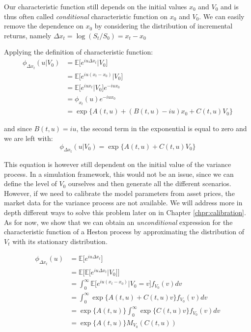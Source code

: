 \bigskip


Our characteristic function still depends on the initial values $x_0$ and  $V_0$ and is thus often called \textit{conditional} characteristic function on $x_0$ and $V_0$.
We can easily remove the dependence on $x_0$ by considering the distribution of incremental returns, namely $\Delta x_t = \log (S_t / S_0) = x_t - x_0$

Applying the definition of characteristic function:
\begin{equation*}
	\begin{split}
	\phi_{\Delta x_t}(u|V_0) &= \mathbb{E}\big[e^{i u \Delta x_t} |V_0\big] \\
	&=  \mathbb{E}\big[e^{i u ( x_t - x_0)}|V_0\big]\\
	&= \mathbb{E}\big[e^{i u x_t}|V_0\big] e^{-i u x_0}\\
	&= \phi_{x_t}(u) e^{-i u x_0}\\
	&= \exp\{A(t,u) + (B(t,u) - iu) x_0 + C(t,u) V_0\}
	\end{split}
\end{equation*}

and since $B(t,u)  = i u$, the second term in the exponential is equal to zero and we are left with:
\begin{equation}
\label{eq:chf_V0}
\phi_{\Delta x_t}(u|V_0) =  \exp\{A(t,u) + C(t,u) V_0\}
\end{equation}




This equation is however still dependent on the initial value of the variance process. In a simulation framework, this would not be an issue, since we can define the level of $V_0$ ourselves and then generate all the different scenarios. However, if we need to calibrate the model parameters from asset prices, the market data for the variance process are not available. We will address more in depth different ways to solve this problem later on in Chapter \ref{chpr:calibration}. As for now, we show that we can obtain an \textit{unconditional} expression for the characteristic function of a Heston process by approximating the distribution of $V_t$ with its stationary distribution.

\begin{equation*}
\begin{split}
	\phi_{\Delta x_t}(u) &= \mathbb{E}\big[e^{i u \Delta x_t} \big] \\
	&= \mathbb{E}\big[ \mathbb{E}\big[ e^{i u \Delta x_t} | V_0\big] \big]\\
	&=  \int_{0}^{\infty} \mathbb{E}\big[e^{i u ( x_t - x_0)}|V_0 = v \big] f_{V_0}(v) dv \\
	&= \int_{0}^{\infty} \exp\{A(t,u) + C(t,u) v\} f_{V_0}(v) dv \\
	&=  \exp\{A(t,u)\} \int_{0}^{\infty}  \exp \{C(t,u) v\} f_{V_0}(v) dv\\
	&= \exp\{A(t,u) \} M_{V_0}(C(t,u))
\end{split}
\end{equation*}

